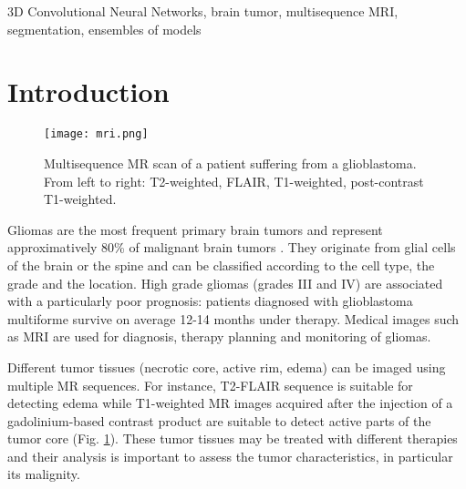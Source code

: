 \documentclass[preprint,12pt]{elsarticle}
\begin{document}
\begin{frontmatter}
\begin{keyword}
3D Convolutional Neural Networks, brain tumor, multisequence MRI, segmentation, ensembles of models


\end{keyword}

\end{frontmatter}














\section{Introduction}
\begin{figure}[!]
\centering
\texttt{[image: mri.png]}
\caption{Multisequence MR scan of a patient suffering from a glioblastoma. From left to right: T2-weighted, FLAIR, T1-weighted, post-contrast T1-weighted.}\label{fig_mri}
\end{figure} 

Gliomas are the most frequent primary brain tumors and represent approximatively 80\% of malignant brain tumors \cite{goodenberger2012genetics}. They originate from glial cells of the brain or the spine and can be classified according to the cell type, the grade and the location. High grade gliomas (grades III and IV) are associated with a particularly poor prognosis: patients diagnosed with glioblastoma multiforme survive on average 12-14 months under therapy. Medical images such as MRI \cite{bauer2013survey} are used for diagnosis, therapy planning and monitoring of gliomas.



Different tumor tissues (necrotic core, active rim, edema) can be imaged using multiple MR sequences. For instance, T2-FLAIR sequence is suitable for detecting edema while T1-weighted MR images acquired after the injection of a gadolinium-based contrast product are suitable to detect active parts of the tumor core (Fig. \ref{fig_mri}). These tumor tissues may be treated with different therapies \cite{gillies2015radiomics} and their analysis is important to assess the tumor characteristics, in particular its malignity.
\end{document}
